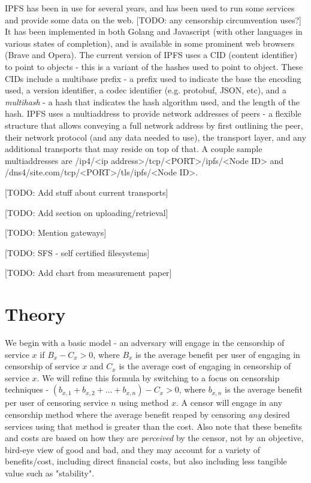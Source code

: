 \documentclass[12pt]{report}
\begin{document}
IPFS has been in use for several years, and has been used to run some services and provide some data on the web. [TODO: any censorship circumvention uses?] It has been implemented in both Golang and Javascript (with other languages in various states of completion), and is available in some prominent web browsers (Brave and Opera).\cite{ipfs-measure} The current version of IPFS uses a CID (content identifier) to point to objects - this is a variant of the hashes used to point to object. These CIDs include a multibase prefix - a prefix used to indicate the base the encoding used, a version identifier, a codec identifier (e.g. protobuf, JSON, etc), and a \emph{multihash} - a hash that indicates the hash algorithm used, and the length of the hash.\cite{ipfs-measure} IPFS uses a multiaddress to provide network addresses of peers - a flexible structure that allows conveying a full network address by first outlining the peer, their network protocol (and any data needed to use), the transport layer, and any additional transports that may reside on top of that.\cite{ipfs-measure} A couple sample multiaddresses are /ip4/<ip address>/tcp/<PORT>/ipfs/<Node ID> and /dns4/site.com/tcp/<PORT>/tls/ipfs/<Node ID>.

[TODO: Add stuff about current transports]

[TODO: Add section on uploading/retrieval]

[TODO: Mention gateways]

[TODO: SFS - self certified filesystems]

[TODO: Add chart from measurement paper]

\chapter{Theory}
\label{theory}

We begin with a basic model - an adversary will engage in the censorship of service $x$ if $B_x - C_x > 0$, where $B_x$ is the average benefit per user of engaging in censorship of service $x$ and $C_x$ is the average cost of engaging in censorship of service $x$. We will refine this formula by switching to a focus on censorship techniques - $(b_{x,1} + b_{x,2} + ... + b_{x,n}) - C_x > 0$, where $b_{x,n}$ is the average benefit per user of censoring service $n$ using method $x$. A censor will engage in any censorship method where the average benefit reaped by censoring \emph{any} desired services using that method is greater than the cost. Also note that these benefits and costs are based on how they are \emph{perceived} by the censor, not by an objective, bird-eye view of good and bad, and they may account for a variety of benefits/cost, including direct financial costs, but also including less tangible value such as "stability".
\end{document}
